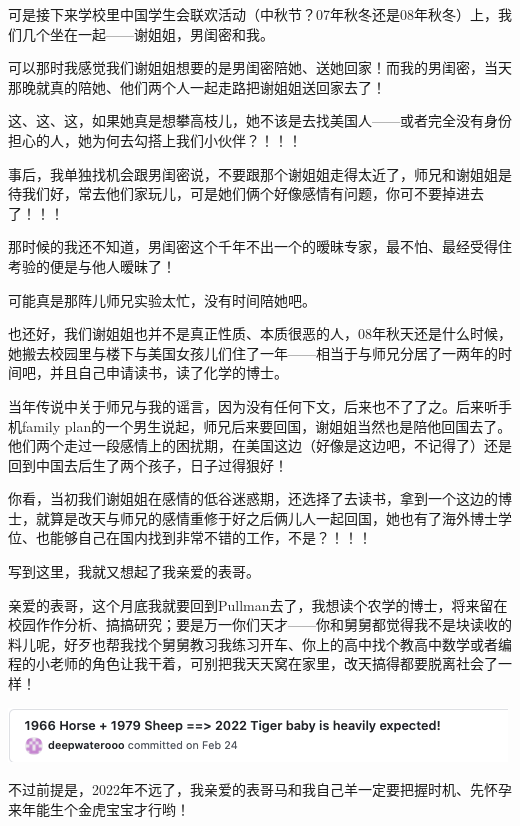 \documentclass[9pt, b5paper]{article}
\begin{document}
可是接下来学校里中国学生会联欢活动（中秋节？07年秋冬还是08年秋冬）上，我们几个坐在一起——谢姐姐，男闺密和我。

可以那时我感觉我们谢姐姐想要的是男闺密陪她、送她回家！而我的男闺密，当天那晚就真的陪她、他们两个人一起走路把谢姐姐送回家去了！

这、这、这，如果她真是想攀高枝儿，她不该是去找美国人——或者完全没有身份担心的人，她为何去勾搭上我们小伙伴？！！！

事后，我单独找机会跟男闺密说，不要跟那个谢姐姐走得太近了，师兄和谢姐姐是待我们好，常去他们家玩儿，可是她们俩个好像感情有问题，你可不要掉进去了！！！

那时候的我还不知道，男闺密这个千年不出一个的暧昧专家，最不怕、最经受得住考验的便是与他人暧昧了！

可能真是那阵儿师兄实验太忙，没有时间陪她吧。

也还好，我们谢姐姐也并不是真正性质、本质很恶的人，08年秋天还是什么时候，她搬去校园里与楼下与美国女孩儿们住了一年——相当于与师兄分居了一两年的时间吧，并且自己申请读书，读了化学的博士。

当年传说中关于师兄与我的谣言，因为没有任何下文，后来也不了了之。后来听手机family plan的一个男生说起，师兄后来要回国，谢姐姐当然也是陪他回国去了。他们两个走过一段感情上的困扰期，在美国这边（好像是这边吧，不记得了）还是回到中国去后生了两个孩子，日子过得狠好！

你看，当初我们谢姐姐在感情的低谷迷惑期，还选择了去读书，拿到一个这边的博士，就算是改天与师兄的感情重修于好之后俩儿人一起回国，她也有了海外博士学位、也能够自己在国内找到非常不错的工作，不是？！！！

写到这里，我就又想起了我亲爱的表哥。

亲爱的表哥，这个月底我就要回到Pullman去了，我想读个农学的博士，将来留在校园作作分析、搞搞研究；要是万一你们天才——你和舅舅都觉得我不是块读收的料儿呢，好歹也帮我找个舅舅教习我练习开车、你上的高中找个教高中数学或者编程的小老师的角色让我干着，可别把我天天窝在家里，改天搞得都要脱离社会了一样！

\begin{center}
\includegraphics[width=.9\linewidth]{./pic/backups_plans_20210503_141923.png}
\end{center}

不过前提是，2022年不远了，我亲爱的表哥马和我自己羊一定要把握时机、先怀孕来年能生个金虎宝宝才行哟！
\end{document}
